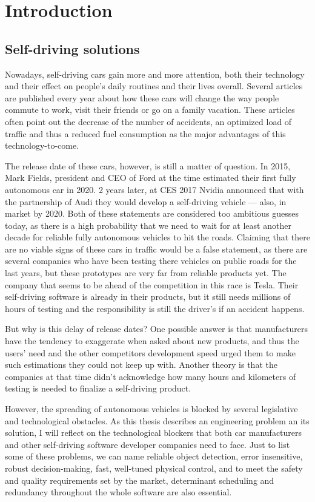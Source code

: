 \chapter{Introduction}
\label{chap:introduction}

\section{Self-driving solutions}
Nowadays, self-driving cars gain more and more attention, both their technology and their effect on people's daily routines and their lives overall. Several articles are published every year about how these cars will change the way people commute to work, visit their friends or go on a family vacation. These articles often point out the decrease of the number of accidents, an optimized load of traffic and thus a reduced fuel consumption as the major advantages of this technology-to-come.

The release date of these cars, however, is still a matter of question. In 2015, Mark Fields, president and CEO of Ford at the time estimated their first fully autonomous car in 2020. 2 years later, at CES 2017 Nvidia announced that with the partnership of Audi they would develop a self-driving vehicle --- also, in market by 2020. Both of these statements are considered too ambitious guesses today, as there is a high probability that we need to wait for at least another decade for reliable fully autonomous vehicles to hit the roads. Claiming that there are no viable signs of these cars in traffic would be a false statement, as there are several companies who have been testing there vehicles on public roads for the last years, but these prototypes are very far from reliable products yet. The company that seems to be ahead of the competition in this race is Tesla. Their self-driving software is already in their products, but it still needs millions of hours of testing and the responsibility is still the driver's if an accident happens.

But why is this delay of release dates? One possible answer is that manufacturers have the tendency to exaggerate when asked about new products, and thus the users' need and the other competitors development speed urged them to make such estimations they could not keep up with. Another theory is that the companies at that time didn't acknowledge how many hours and kilometers of testing is needed to finalize a self-driving product.

However, the spreading of autonomous vehicles is blocked by several legislative and technological obstacles. As this thesis describes an engineering problem an its solution, I will reflect on the technological blockers that both car manufacturers and other self-driving software developer companies need to face. Just to list some of these problems, we can name reliable object detection, error insensitive, robust decision-making, fast, well-tuned physical control, and to meet the safety and quality requirements set by the market, determinant scheduling and redundancy throughout the whole software are also essential.

